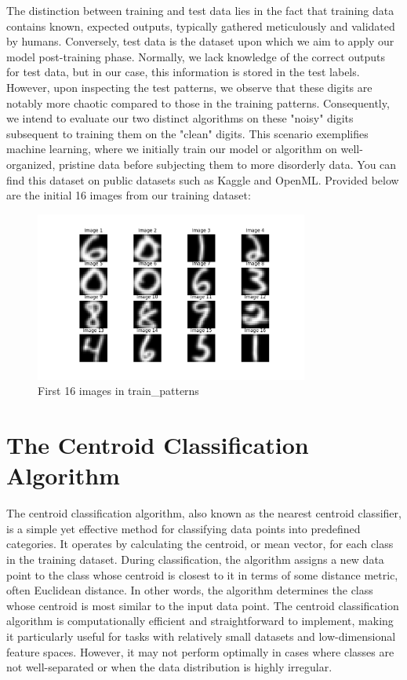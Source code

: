 \documentclass{article} %
\begin{document}
    \noindent The distinction between training and test data lies in the fact that training data contains known, expected outputs, typically gathered meticulously and validated by humans. Conversely, test data is the dataset upon which we aim to apply our model post-training phase. Normally, we lack knowledge of the correct outputs for test data, but in our case, this information is stored in the test labels. However, upon inspecting the test patterns, we observe that these digits are notably more chaotic compared to those in the training patterns. Consequently, we intend to evaluate our two distinct algorithms on these "noisy" digits subsequent to training them on the "clean" digits. This scenario exemplifies machine learning, where we initially train our model or algorithm on well-organized, pristine data before subjecting them to more disorderly data. You can find this dataset on public datasets such as Kaggle and OpenML. Provided below are the initial 16 images from our training dataset:
    \begin{figure}
        \centering
        \includegraphics[width=9cm]{Figure_1.png}
        \caption{First 16 images in train\_patterns}
        \label{fig:fig1}
    \end{figure}

    \FloatBarrier

    \section{The Centroid Classification Algorithm}
        The centroid classification algorithm, also known as the nearest centroid classifier, is a simple yet effective method for classifying data points into predefined categories. It operates by calculating the centroid, or mean vector, for each class in the training dataset. During classification, the algorithm assigns a new data point to the class whose centroid is closest to it in terms of some distance metric, often Euclidean distance. In other words, the algorithm determines the class whose centroid is most similar to the input data point. The centroid classification algorithm is computationally efficient and straightforward to implement, making it particularly useful for tasks with relatively small datasets and low-dimensional feature spaces. However, it may not perform optimally in cases where classes are not well-separated or when the data distribution is highly irregular.
\end{document}
